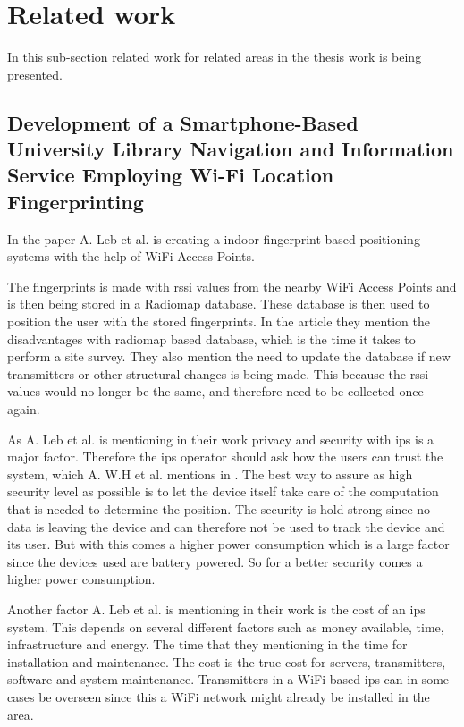 \section{Related work}\label{sec:theoryRelatedWork}
In this sub-section related work for related areas in the thesis work is being presented.

\subsection{Development of a Smartphone-Based University Library Navigation and Information Service Employing Wi-Fi Location Fingerprinting}\label{sec:}
In the paper \cite{DevelopmentSmartphoneBasedUniversity2021} A. Leb et al. is creating a indoor fingerprint based positioning systems with the help of WiFi Access Points.

\bigskip

The fingerprints is made with \acrshort{rssi} values from the nearby WiFi Access Points and is then being stored in a Radiomap database.
These database is then used to position the user with the stored fingerprints.
In the article they mention the disadvantages with radiomap based database, which is the time it takes to perform a site survey.
They also mention the need to update the database if new transmitters or other structural changes is being made.
This because the \acrshort{rssi} values would no longer be the same, and therefore need to be collected once again.

\bigskip

As A. Leb et al. is mentioning in their work privacy and security with \acrfull{ips} is a major factor.
Therefore the \acrshort{ips} operator should ask how the users can trust the system, which A. W.H et al. mentions in \cite{SurveyWirelessIndoor2019}.
The best way to assure as high security level as possible is to let the device itself take care of the computation that is needed to determine the position.
The security is hold strong since no data is leaving the device and can therefore not be used to track the device and its user.
But with this comes a higher power consumption which is a large factor since the devices used are battery powered.
So for a better security comes a higher power consumption.

\bigskip

Another factor A. Leb et al. is mentioning in their work is the cost of an \acrshort{ips} system.
This depends on several different factors such as money available, time, infrastructure and energy.
The time that they mentioning in the time for installation and maintenance.
The cost is the true cost for servers, transmitters, software and system maintenance.
Transmitters in a WiFi based \acrshort{ips} can in some cases be overseen since this a WiFi network might already be installed in the area.



